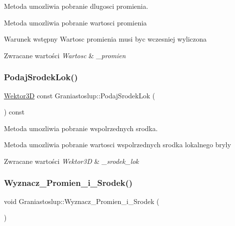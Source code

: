 Metoda umozliwia pobranie dlugosci promienia. 

Metoda umozliwia pobranie wartosci promienia \begin{DoxyPrecond}{Warunek wstępny}
Wartosc promienia musi byc wczesniej wyliczona 
\end{DoxyPrecond}

\begin{DoxyRetVals}{Zwracane wartości}
{\em Wartosc} & {\itshape \+\_\+promien} \\
\hline
\end{DoxyRetVals}
\mbox{\label{classGraniastoslup_aa573569ea9ca59cc99024c8e2a3d4308}} 
\subsubsection{\texorpdfstring{Podaj\+Srodek\+Lok()}{PodajSrodekLok()}}
{\footnotesize\ttfamily \hyperlink{classSWektor}{Wektor3D} const Graniastoslup\+::\+Podaj\+Srodek\+Lok (\begin{DoxyParamCaption}{ }\end{DoxyParamCaption}) const\hspace{0.3cm}{\ttfamily [inline]}}



Metoda umozliwia pobranie wspolrzednych srodka. 

Metoda umozliwia pobranie wartosci wspolrzednych srodka lokalnego bryly 
\begin{DoxyRetVals}{Zwracane wartości}
{\em Wektor3D} & {\itshape \+\_\+srodek\+\_\+lok} \\
\hline
\end{DoxyRetVals}
\mbox{\label{classGraniastoslup_a348b25e965350ea5c8e5ebee39b35357}} 
\subsubsection{\texorpdfstring{Wyznacz\+\_\+\+Promien\+\_\+i\+\_\+\+Srodek()}{Wyznacz\_Promien\_i\_Srodek()}}
{\footnotesize\ttfamily void Graniastoslup\+::\+Wyznacz\+\_\+\+Promien\+\_\+i\+\_\+\+Srodek (\begin{DoxyParamCaption}{ }\end{DoxyParamCaption})}



